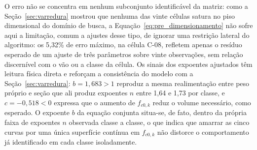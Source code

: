 O erro não se concentra em nenhum subconjunto identificável da matriz: como a Seção~\ref{sec:varredura} mostrou que nenhuma das vinte células satura no piso dimensional do domínio de busca, a Equação~\eqref{eq:pre_dimensionamento} não sofre aqui a limitação, comum a ajustes desse tipo, de ignorar uma restrição lateral do algoritmo: os 5{,}32\% de erro máximo, na célula C-08, refletem apenas o resíduo esperado de um ajuste de três parâmetros sobre vinte observações, sem relação discernível com o vão ou a classe da célula.
Os sinais dos expoentes ajustados têm leitura física direta e reforçam a consistência do modelo com a Seção~\ref{sec:varredura}: $b = 1{,}683 > 1$ reproduz a mesma realimentação entre peso próprio e seção que ali produz expoentes $n$ entre 1{,}64 e 1{,}73 por classe, e $c = -0{,}518 < 0$ expressa que o aumento de $f_{c0,k}$ reduz o volume necessário, como esperado.
O expoente $b$ da equação conjunta situa-se, de fato, dentro da própria faixa de expoentes $n$ observada classe a classe, o que indica que amarrar as cinco curvas por uma única superfície contínua em $f_{c0,k}$ não distorce o comportamento já identificado em cada classe isoladamente.